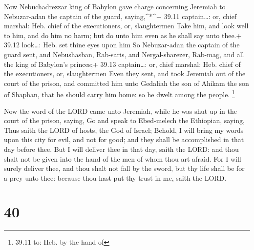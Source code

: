  Now Nebuchadrezzar king of Babylon gave charge concerning
Jeremiah to Nebuzar-adan the captain of the guard, saying,\^{}*\^{}+
39.11 captain\ldots: or, chief marshal: Heb. chief of the executioners,
or, slaughtermen  Take him, and look well to him, and do
him no harm; but do unto him even as he shall say unto thee.+ 39.12
look\ldots: Heb. set thine eyes upon him  So Nebuzar-adan
the captain of the guard sent, and Nebushasban, Rab-saris, and
Nergal-sharezer, Rab-mag, and all the king of Babylon's princes;+ 39.13
captain\ldots: or, chief marshal: Heb. chief of the executioners, or,
slaughtermen  Even they sent, and took Jeremiah out of the
court of the prison, and committed him unto Gedaliah the son of Ahikam
the son of Shaphan, that he should carry him home: so he dwelt among the
people. \footnote{39.11 to: Heb. by the hand of}

 Now the word of the LORD came unto Jeremiah, while he was
shut up in the court of the prison, saying,  Go and speak
to Ebed-melech the Ethiopian, saying, Thus saith the LORD of hosts, the
God of Israel; Behold, I will bring my words upon this city for evil,
and not for good; and they shall be accomplished in that day before
thee.  But I will deliver thee in that day, saith the LORD:
and thou shalt not be given into the hand of the men of whom thou art
afraid.  For I will surely deliver thee, and thou shalt not
fall by the sword, but thy life shall be for a prey unto thee: because
thou hast put thy trust in me, saith the LORD.

\hypertarget{section-39}{%
\section{40}\label{section-39}}

